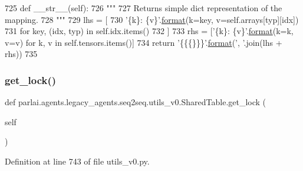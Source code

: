 \begin{DoxyCode}
725     \textcolor{keyword}{def }\_\_str\_\_(self):
726         \textcolor{stringliteral}{"""}
727 \textcolor{stringliteral}{        Returns simple dict representation of the mapping.}
728 \textcolor{stringliteral}{        """}
729         lhs = [
730             \textcolor{stringliteral}{'\{k\}: \{v\}'}.\hyperlink{namespaceparlai_1_1chat__service_1_1services_1_1messenger_1_1shared__utils_a32e2e2022b824fbaf80c747160b52a76}{format}(k=key, v=self.arrays[typ][idx])
731             \textcolor{keywordflow}{for} key, (idx, typ) \textcolor{keywordflow}{in} self.idx.items()
732         ]
733         rhs = [\textcolor{stringliteral}{'\{k\}: \{v\}'}.\hyperlink{namespaceparlai_1_1chat__service_1_1services_1_1messenger_1_1shared__utils_a32e2e2022b824fbaf80c747160b52a76}{format}(k=k, v=v) \textcolor{keywordflow}{for} k, v \textcolor{keywordflow}{in} self.tensors.items()]
734         \textcolor{keywordflow}{return} \textcolor{stringliteral}{'\{\{\{\}\}\}'}.\hyperlink{namespaceparlai_1_1chat__service_1_1services_1_1messenger_1_1shared__utils_a32e2e2022b824fbaf80c747160b52a76}{format}(\textcolor{stringliteral}{', '}.join(lhs + rhs))
735 
\end{DoxyCode}
\mbox{\label{classparlai_1_1agents_1_1legacy__agents_1_1seq2seq_1_1utils__v0_1_1SharedTable_ad5d29371323182d5d5431300ee6aaba1}} 
\subsubsection{\texorpdfstring{get\+\_\+lock()}{get\_lock()}}
{\footnotesize\ttfamily def parlai.\+agents.\+legacy\+\_\+agents.\+seq2seq.\+utils\+\_\+v0.\+Shared\+Table.\+get\+\_\+lock (\begin{DoxyParamCaption}\item[{}]{self }\end{DoxyParamCaption})}



Definition at line 743 of file utils\+\_\+v0.\+py.


